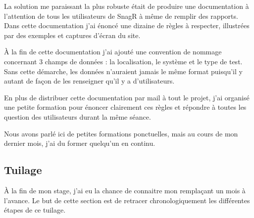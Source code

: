 La solution me paraissant la plus robuste était de produire une documentation à l'attention de tous les utilisateurs de \gls{SnagR} à même de remplir des rapports. 
Dans cette documentation j'ai énoncé une dizaine de règles à respecter, illustrées par des exemples et captures d'écran du site. 

À la fin de cette documentation j'ai ajouté une convention de nommage concernant 3 champs de données : la localisation, le système et le type de test. 
Sans cette démarche, les données n'auraient jamais le même format puisqu'il y autant de façon de les renseigner qu'il y a d'utilisateurs.

En plus de distribuer cette documentation par mail à tout le projet, j'ai organisé une petite formation pour énoncer clairement ces règles et répondre à toutes les question des utilisateurs durant la même séance.

Nous avons parlé ici de petites formations ponctuelles, mais au cours de mon dernier mois, j'ai du former quelqu'un en continu.

\subsection{Tuilage}

À la fin de mon stage, j'ai eu la chance de connaitre mon remplaçant un mois à l'avance. Le but de cette section est de retracer chronologiquement les différentes étapes de ce tuilage.

